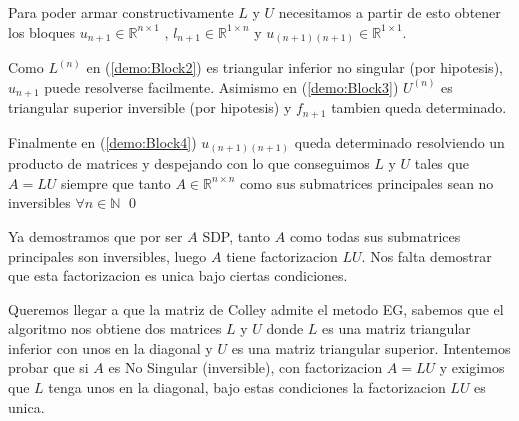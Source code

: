 \begin{itemize}
  Para poder armar constructivamente $L$ y $U$ necesitamos a partir de esto obtener los bloques $u_{n+1} \in \mathbb{R}^{n \times 1}$ , $l_{n+1} \in \mathbb{R}^{1 \times n}$ y $u_{(n+1)(n+1)} \in \mathbb{R}^{1 \times 1}$.
  
  Como $L^{(n)}$ en (\ref{demo:Block2}) es triangular inferior no singular (por hipotesis), $u_{n+1}$ puede resolverse facilmente. Asimismo en (\ref{demo:Block3}) $U^{(n)}$ es triangular superior inversible (por hipotesis) y $f_{n+1}$ tambien queda determinado.
  
	Finalmente en (\ref{demo:Block4}) $u_{(n+1)(n+1)}$ queda determinado resolviendo un producto de matrices y despejando con lo que conseguimos $L$ y $U$ tales que $A = L U$ siempre que tanto $A \in \mathbb{R}^{n \times n}$ como sus submatrices principales sean no inversibles $\forall n \in \mathbb{N}$
\qed

\end{itemize}

Ya demostramos que por ser $A$ SDP, tanto $A$ como todas sus submatrices principales son inversibles, luego $A$ tiene factorizacion $LU$. Nos falta demostrar que esta factorizacion es unica bajo ciertas condiciones.

Queremos llegar a que la matriz de Colley admite el metodo EG, sabemos que el algoritmo nos obtiene dos matrices $L$ y $U$ donde $L$ es una matriz triangular inferior con unos en la diagonal y $U$ es una matriz triangular superior.
Intentemos probar que si $A$ es No Singular (inversible), con factorizacion $A = LU$ y exigimos que $L$ tenga unos en la diagonal, bajo estas condiciones la factorizacion $LU$ es unica.

